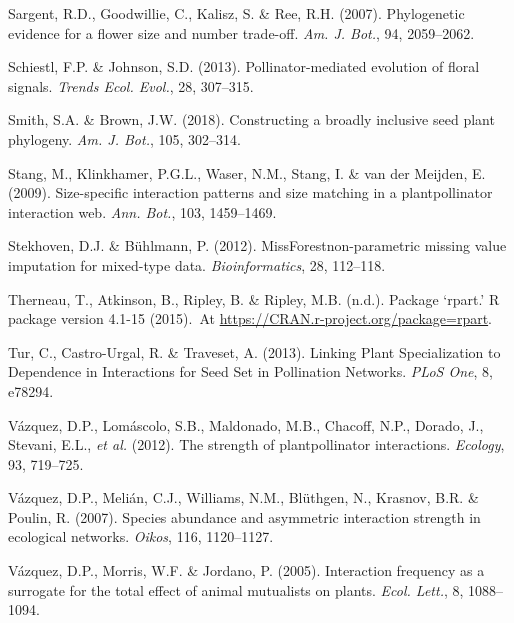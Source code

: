 \documentclass[
  12pt,
  a4paper,
]{article}
\newlength{\cslhangindent}
\newlength{\cslentryspacingunit} %
\newenvironment{CSLReferences}[2] %
 {%
  \setlength{\parindent}{0pt}
  \ifodd #1
  \let\oldpar\par
  \def\par{\hangindent=\cslhangindent\oldpar}
  \fi
  \setlength{\parskip}{#2\cslentryspacingunit}
 }%
 {}
\begin{document}
\begin{CSLReferences}{1}{0}
\leavevmode{}%
Sargent, R.D., Goodwillie, C., Kalisz, S. \& Ree, R.H. (2007). Phylogenetic evidence for a flower size and number trade-off. \emph{Am. J. Bot.}, 94, 2059--2062.

\leavevmode{}%
Schiestl, F.P. \& Johnson, S.D. (2013). Pollinator-mediated evolution of floral signals. \emph{Trends Ecol. Evol.}, 28, 307--315.

\leavevmode{}%
Smith, S.A. \& Brown, J.W. (2018). Constructing a broadly inclusive seed plant phylogeny. \emph{Am. J. Bot.}, 105, 302--314.

\leavevmode{}%
Stang, M., Klinkhamer, P.G.L., Waser, N.M., Stang, I. \& van der Meijden, E. (2009). Size-specific interaction patterns and size matching in a plant\textendash pollinator interaction web. \emph{Ann. Bot.}, 103, 1459--1469.

\leavevmode{}%
Stekhoven, D.J. \& Bühlmann, P. (2012). {MissForest}\textemdash non-parametric missing value imputation for mixed-type data. \emph{Bioinformatics}, 28, 112--118.

\leavevmode{}%
Therneau, T., Atkinson, B., Ripley, B. \& Ripley, M.B. (n.d.). Package {`rpart.'} R package version 4.1-15 (2015).~At \href{https://CRAN.R-project.org/package=rpart}{https://CRAN.r-project.org/package=rpart}.

\leavevmode{}%
Tur, C., Castro-Urgal, R. \& Traveset, A. (2013). Linking {Plant Specialization} to {Dependence} in {Interactions} for {Seed Set} in {Pollination Networks}. \emph{PLoS One}, 8, e78294.

\leavevmode{}%
Vázquez, D.P., Lomáscolo, S.B., Maldonado, M.B., Chacoff, N.P., Dorado, J., Stevani, E.L., \emph{et al.} (2012). The strength of plant\textendash pollinator interactions. \emph{Ecology}, 93, 719--725.

\leavevmode{}%
Vázquez, D.P., Melián, C.J., Williams, N.M., Blüthgen, N., Krasnov, B.R. \& Poulin, R. (2007). Species abundance and asymmetric interaction strength in ecological networks. \emph{Oikos}, 116, 1120--1127.

\leavevmode{}%
Vázquez, D.P., Morris, W.F. \& Jordano, P. (2005). Interaction frequency as a surrogate for the total effect of animal mutualists on plants. \emph{Ecol. Lett.}, 8, 1088--1094.


\end{CSLReferences}
\end{document}
